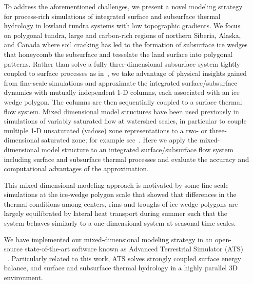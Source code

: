 \documentclass[review]{elsarticle}
\begin{document}
To address the aforementioned challenges, we present a novel modeling strategy for process-rich simulations of integrated surface and subsurface thermal hydrology in lowland tundra systems with low topographic gradients. We focus on polygonal tundra, large and carbon-rich regions of northern Siberia, Alaska, and Canada where soil cracking has led to the formation of subsurface ice wedges that honeycomb the subsurface and tesselate the land surface into polygonal patterns. Rather than solve a fully three-dimensional subsurface system tightly coupled to surface processes as in~\cite{spainter2016integrated}, we take advantage of physical insights gained from fine-scale simulations and approximate the integrated surface/subsurface dynamics with mutually independent 1-D columns, each associated with an ice wedge polygon. The columns are then sequentially coupled to a surface thermal flow system. Mixed dimensional model structures have been used previously in simulations of variably saturated flow at watershed scales, in particular to couple multiple 1-D unsaturated (vadose) zone representations to a two- or three-dimensional saturated zone; for example see~\cite{pikul1974numerical,zhu2011method}. Here we apply the mixed-dimensional model structure to an integrated surface/subsurface flow system including surface and subsurface thermal processes and evaluate the accuracy and computational advantages of the approximation. 

This mixed-dimensional modeling approach is motivated by some fine-scale simulations at the ice-wedge polygon scale that showed that differences in the thermal conditions among centers, rims and troughs of ice-wedge polygons are largely equilibrated by lateral heat transport during summer such that the system behaves similarly to a one-dimensional system at seasonal time scales. 

We have implemented our mixed-dimensional modeling strategy in an open-source state-of-the-art software known as Advanced Terrestrial Simulator (ATS) 
~\cite{ecoon2016managing, spainter2016integrated}. Particularly related to this work, ATS solves strongly coupled surface energy balance, and surface and subsurface thermal hydrology in a highly parallel 3D environment. 
\end{document}
